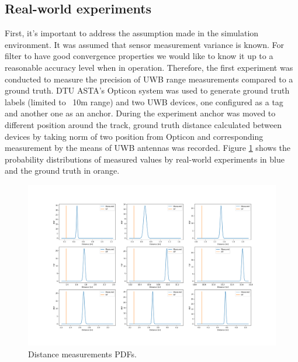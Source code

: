 \subsection{Real-world experiments}

First, it's important to address the assumption made in the simulation environment. It was assumed that sensor measurement variance is known. For filter to have good convergence properties we would like to know it up to a reasonable accuracy level when in operation. Therefore, the first experiment was conducted to measure the precision of UWB range measurements compared to a ground truth. DTU ASTA's Opticon system was used to generate ground truth labels (limited to ~10m range) and two UWB devices, one configured as a tag and another one as an anchor. During the experiment anchor was moved to different position around the track, ground truth distance calculated between devices by taking norm of two position from Opticon and corresponding measurement by the means of UWB antennas was recorded. Figure \ref{fig:distancePDF} shows the probability distributions of measured values by real-world experiments in blue and the ground truth in orange.
\begin{figure}[H]
    \includegraphics[width=\linewidth]{figures/distancePDF.png}
    \caption{Distance measurements PDFs.}
    \label{fig:distancePDF}
\end{figure}

